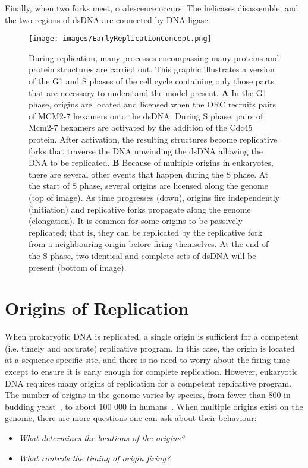 		Finally, when two forks meet, coalescence occurs:
		The helicases disassemble, and the two regions of dsDNA are connected by DNA ligase.~\cite{MolecularCellBiology}
	
	\begin{figure}[tbh]
		\begin{center}
			\texttt{[image: images/EarlyReplicationConcept.png]}
		\end{center}
			\caption[Events During Replication]{\label{fig:EarlyReplicationConcept} During replication, many processes encompassing many proteins and protein structures are carried out.
				This graphic illustrates a version of the G1 and S phases of the cell cycle containing only those parts that are necessary to understand the model present.
				\textbf{A} In the G1 phase, origins are located and licensed when the ORC recruits pairs of MCM2-7 hexamers onto the dsDNA.
					During S phase, pairs of Mcm2-7 hexamers are activated by the addition of the Cdc45 protein.
					After activation, the resulting structures become replicative forks that traverse the DNA unwinding the dsDNA allowing the DNA to be replicated.
				\textbf{B} Because of multiple origins in eukaryotes, there are several other events that happen during the S phase.
					At the start of S phase, several origins are licensed along the genome (top of image).
					As time progresses (down), origins fire independently (initiation) and replicative forks propagate along the genome (elongation).
					It is common for some origins to be passively replicated; that is, they can be replicated by the replicative fork from a neighbouring origin before firing themselves.
					At the end of the S phase, two identical and complete sets of dsDNA will be present (bottom of image).}
	\end{figure}
	
	
	\section{Origins of Replication}
	\label{sec:Origins}
	
	When prokaryotic DNA is replicated, a single origin is sufficient for a competent (i.e. timely and accurate) replicative program.
	In this case, the origin is located at a sequence specific site, and there is no need to worry about the firing-time except to ensure it is early enough for complete replication.
	However, eukaryotic DNA requires many origins of replication for a competent replicative program.
	The number of origins in the genome varies by species, from fewer than 800 in budding yeast~\cite{OriDB}, to about 100 000 in humans~\cite{OriginsReview}.
	When multiple origins exist on the genome, there are more questions one can ask about their behaviour:
	\begin{itemize}
		\item \emph{What determines the locations of the origins?}
		\item \emph{What controls the timing of origin firing?}
	\end{itemize}
	
